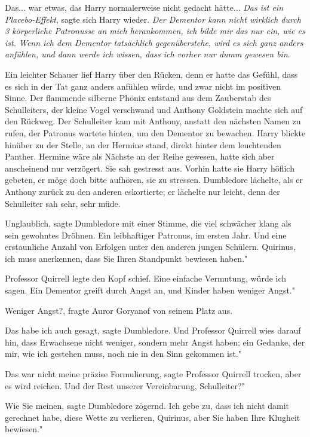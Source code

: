 Das... war etwas, das Harry normalerweise nicht gedacht hätte... \emph{Das ist
ein Placebo-Effekt}, sagte sich Harry wieder. \emph{Der Dementor kann nicht
wirklich durch 3 körperliche Patronusse an mich herankommen, ich bilde mir das
nur ein, wie es ist. Wenn ich dem Dementor tatsächlich gegenüberstehe, wird es
sich ganz anders anfühlen, und dann werde ich wissen, dass ich vorher nur dumm
gewesen bin}.

Ein leichter Schauer lief Harry über den Rücken, denn er hatte das Gefühl, dass
es sich in der Tat ganz anders anfühlen würde, und zwar nicht im positiven
Sinne. Der flammende silberne Phönix entstand aus dem Zauberstab des
Schulleiters, der kleine Vogel verschwand und Anthony Goldstein machte sich auf
den Rückweg. Der Schulleiter kam mit Anthony, anstatt den nächsten Namen zu
rufen, der Patronus wartete hinten, um den Dementor zu bewachen. Harry blickte
hinüber zu der Stelle, an der Hermine stand, direkt hinter dem leuchtenden
Panther. Hermine wäre als Nächste an der Reihe gewesen, hatte sich aber
anscheinend nur verzögert. Sie sah gestresst aus. Vorhin hatte sie Harry höflich
gebeten, er möge doch bitte aufhören, sie zu stressen. Dumbledore lächelte, als
er Anthony zurück zu den anderen eskortierte; er lächelte nur leicht, denn der
Schulleiter sah sehr, sehr müde.

\glqq{}Unglaublich\grqq{}, sagte Dumbledore mit einer Stimme, die viel schwächer
klang als sein gewohntes Dröhnen. \glqq{}Ein leibhaftiger Patronus, im ersten
Jahr. Und eine erstaunliche Anzahl von Erfolgen unter den anderen jungen
Schülern. Quirinus, ich muss anerkennen, dass Sie Ihren Standpunkt bewiesen
haben."

Professor Quirrell legte den Kopf schief. \glqq{}Eine einfache Vermutung, würde
ich sagen. Ein Dementor greift durch Angst an, und Kinder haben weniger Angst."

\glqq{}Weniger Angst?\grqq{}, fragte Auror Goryanof von seinem Platz aus.

\glqq{}Das habe ich auch gesagt\grqq{}, sagte Dumbledore. \glqq{}Und Professor
Quirrell wies darauf hin, dass Erwachsene nicht weniger, sondern mehr Angst
haben; ein Gedanke, der mir, wie ich gestehen muss, noch nie in den Sinn
gekommen ist."

\glqq{}Das war nicht meine präzise Formulierung\grqq{}, sagte Professor Quirrell
trocken, \glqq{}aber es wird reichen. Und der Rest unserer Vereinbarung,
Schulleiter?"

\glqq{}Wie Sie meinen\grqq{}, sagte Dumbledore zögernd. \glqq{}Ich gebe zu, dass
ich nicht damit gerechnet habe, diese Wette zu verlieren, Quirinus, aber Sie
haben Ihre Klugheit bewiesen."

